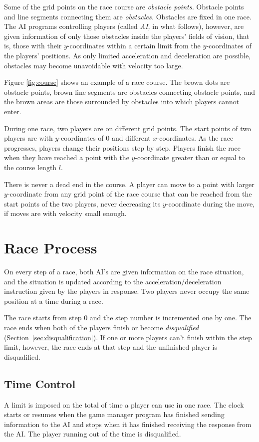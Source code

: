 \documentclass[11pt]{article}
\newcommand\secref[1]{\mbox{Section~\ref{#1}}}
\begin{document}
Some of the grid points on the race course are {\em obstacle points.}
Obstacle points and line segments connecting them are {\em obstacles.}
Obstacles are fixed in one race.  The AI programs controlling players
(called {\em AI,} in what follows), however, are given information of
only those obstacles inside the players' fields of vision, that is,
those with their $y$-coordinates within a certain limit from the
$y$-coordinates of the players' positions.  As only limited
acceleration and deceleration are possible, obstacles may become
unavoidable with velocity too large.

Figure \ref{fig:course} shows an example of a race course.  The brown
dots are obstacle points, brown line segments are obstacles connecting
obstacle points, and the brown areas are those surrounded by obstacles
into which players cannot enter.

During one race, two players are on different grid points.  The start
points of two players are with $y$-coordinates of $0$ and different
$x$-coordinates.  As the race progresses, players change their
positions step by step.  Players finish the race when they have reached
a point with the $y$-coordinate greater than or equal to the course
length $l$.

There is never a dead end in the course.  A player can move to a point
with larger $y$-coordinate from any grid point of the race course that
can be reached from the start points of the two players, never
decreasing its $y$-coordinate during the move, if moves are with
velocity small enough.

\section{Race Process}\label{sec:race_process}
On every step of a race, both AI's are given information on the race
situation, and the situation is updated according to the
acceleration/deceleration instruction given by the players in
response.  Two players never occupy the same position at a time during
a race.

The race starts from step 0 and the step number is incremented one by
one.  The race ends when both of the players finish or become \emph{disqualified} (\secref{sec:disqualification}).  If one or more
players can't finish within the step limit, however, the race ends at
that step and the unfinished player is disqualified.

\subsection{Time Control}\label{sec:consideration_time}
A limit is imposed on the total of time a player can use in one race.
The clock starts or resumes when the game manager program has finished
sending information to the AI and stops when it has finished
receiving the response from the AI.  The player running out of
the time is disqualified.
\end{document}
